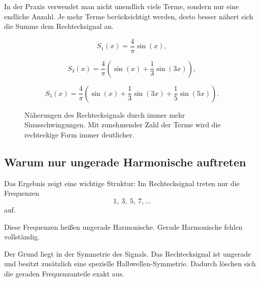 In der Praxis verwendet man nicht unendlich viele Terme,
sondern nur eine endliche Anzahl.
Je mehr Terme berücksichtigt werden,
desto besser nähert sich die Summe dem Rechtecksignal an.

\[
S_1(x)=\frac{4}{\pi}\sin(x),
\]

\[
S_3(x)=\frac{4}{\pi}
\left(
\sin(x)+\frac{1}{3}\sin(3x)
\right),
\]

\[
S_5(x)=\frac{4}{\pi}
\left(
\sin(x)+\frac{1}{3}\sin(3x)+\frac{1}{5}\sin(5x)
\right).
\]
\FloatBarrier
\begin{figure}[H]
	\centering
	\caption{Näherungen des Rechtecksignals durch immer mehr Sinusschwingungen.
		Mit zunehmender Zahl der Terme wird die rechteckige Form immer deutlicher.}
	\label{fig:rechtecksignal_fourier_naeherung}
\end{figure}

\subsection{Warum nur ungerade Harmonische auftreten}

Das Ergebnis zeigt eine wichtige Struktur:
Im Rechtecksignal treten nur die Frequenzen
\[
1,\ 3,\ 5,\ 7,\ldots
\]
auf.

Diese Frequenzen heißen ungerade Harmonische.
Gerade Harmonische fehlen vollständig.

Der Grund liegt in der Symmetrie des Signals.
Das Rechtecksignal ist ungerade und besitzt zusätzlich eine spezielle Halbwellen-Symmetrie.
Dadurch löschen sich die geraden Frequenzanteile exakt aus.


